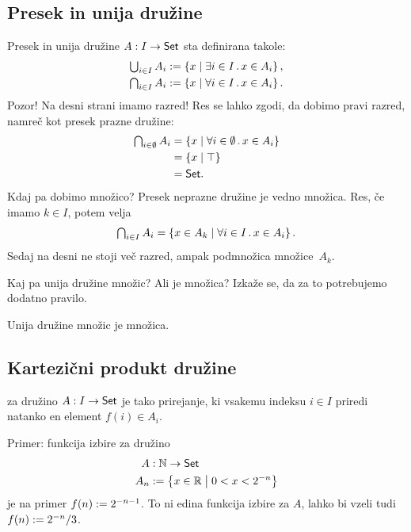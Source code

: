 \subsection{Presek in unija družine}
\label{sec:presek-in-unija-druzine}

Presek in unija družine $A : I \to \mathsf{Set}$ sta definirana takole:
%
\begin{align*}
  \Union{i \in I} A_i &\defeq \set{ x \such \some{i \in I} x \in A_i },
  \\
  \Inter{i \in I} A_i &\defeq \set{ x \such \all{ i \in I} x \in A_i }.
\end{align*}
%
Pozor! Na desni strani imamo razred! Res se lahko zgodi, da dobimo pravi razred, namreč
kot presek prazne družine:
%
\begin{align*}
  \Inter{i \in \emptyset} A_i
  &= \set{ x \such \all{ i \in \emptyset} x \in A_i } \\
  &= \set { x \such \top } \\
  &= \Set.
\end{align*}
%
Kdaj pa dobimo množico? Presek neprazne družine je vedno množica. Res, če imamo
$k \in I$, potem velja
%
\begin{equation*}
    \Inter{i \in I} A_i = \set{ x \in A_k \such \all{i \in I} x \in A_i}.
\end{equation*}
%
Sedaj na desni ne stoji več razred, ampak podmnožica množice~$A_k$.

Kaj pa unija družine množic? Ali je množica? Izkaže se, da za to potrebujemo dodatno pravilo.

\begin{pravilo}
  \label{pravilo:unija-druzine}
  Unija družine množic je množica.
\end{pravilo}


\subsection{Kartezični produkt družine}
\label{sec:produkt-druzine}

\begin{definicija}
  \label{def:funkcija-izbire}
   za družino $A : I \to \mathsf{Set}$ je tako prirejanje, ki vsakemu indeksu $i \in I$ priredi natanko en element $f(i) \in A_i$.
\end{definicija}

\begin{zgled}
  Primer: funkcija izbire za družino
  \begin{align*}
  A &: \mathbb{N} \to \mathsf{Set} \\
  A_n &\mathrel{{:}{=}} \left\{ x \in \mathbb{R} \; \middle| \; 0 < x < 2^{-n} \right\}
  \end{align*}
  je na primer $f(n) \mathrel{{:}{=}} 2^{-n - 1}$. To ni edina funkcija izbire za $A$, lahko bi vzeli tudi $f(n) \mathrel{{:}{=}} 2^{-n} / 3$.
\end{zgled}


